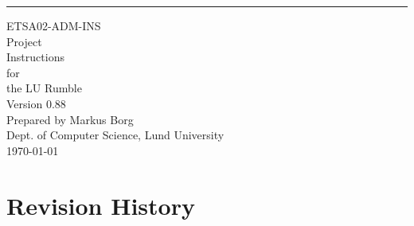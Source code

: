 \documentclass{scrreprt}
\date{}
\def\myversion{0.88 }
\begin{document}
\begin{flushright}
    \rule{16cm}{5pt}\vskip1cm
    \begin{bfseries}
    	\LARGE{ETSA02-ADM-INS}\\
    	\vspace{1.5cm}
        \Huge{Project\\ Instructions}\\
        \vspace{0.5cm}
        for\\
        \vspace{0.5cm}
        the LU Rumble\\
        \vspace{1.5cm}
        \LARGE{Version \myversion}\\ %
        \vspace{1.5cm}
        Prepared by Markus Borg\\
        Dept. of Computer Science, Lund University\\
        \vspace{1.5cm}
        \today\\
    \end{bfseries}
\end{flushright}

\tableofcontents


\chapter*{Revision History}
\end{document}
